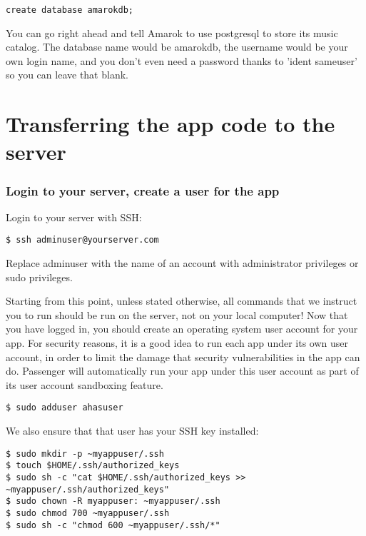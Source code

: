 \documentclass[11pt]{article}
\begin{document}
\begin{verbatim}
create database amarokdb;
\end{verbatim}

You can go right ahead and tell Amarok to use postgresql to store its music catalog. The database name would be amarokdb, the username would be your own login name, and you don't even need a password thanks to 'ident sameuser' so you can leave that blank. 

\section{Transferring the app code to the server}
\label{sec:orgb84f02d}

\subsubsection{Login to your server, create a user for the app}
\label{sec:org1410642}

Login to your server with SSH:
\begin{verbatim}
$ ssh adminuser@yourserver.com
\end{verbatim}

Replace adminuser with the name of an account with administrator privileges or sudo privileges.

Starting from this point, unless stated otherwise, all commands that we instruct you to run should be run on the server, not on your local computer!
Now that you have logged in, you should create an operating system user account for your app. For security reasons, it is a good idea to run each app under its own user account, in order to limit the damage that security vulnerabilities in the app can do. Passenger will automatically run your app under this user account as part of its user account sandboxing feature.

\begin{verbatim}
$ sudo adduser ahasuser
\end{verbatim}

We also ensure that that user has your SSH key installed:

\begin{verbatim}
$ sudo mkdir -p ~myappuser/.ssh
$ touch $HOME/.ssh/authorized_keys
$ sudo sh -c "cat $HOME/.ssh/authorized_keys >> ~myappuser/.ssh/authorized_keys"
$ sudo chown -R myappuser: ~myappuser/.ssh
$ sudo chmod 700 ~myappuser/.ssh
$ sudo sh -c "chmod 600 ~myappuser/.ssh/*"
\end{verbatim}
\end{document}
